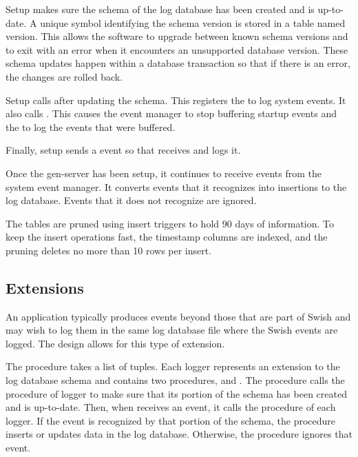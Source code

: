 Setup makes sure the schema of the log database has been created and
is up-to-date. A unique symbol identifying the schema version is
stored in a table named version. This allows the software to upgrade
between known schema versions and to exit with an error when it
encounters an unsupported database version. These schema updates
happen within a database transaction so that if there is an error, the
changes are rolled back.

Setup calls  after updating the
schema. This registers the  to log system events. It
also calls . This causes the event
manager to stop buffering startup events and the  to
log the events that were buffered.

Finally, setup sends a  event so that
 receives and logs it.

Once the  gen-server has been setup, it continues to
receive events from the system event manager. It converts events that
it recognizes into insertions to the log database. Events that it does
not recognize are ignored.

The tables are pruned using insert triggers to hold 90 days of
information. To keep the insert operations fast, the timestamp columns
are indexed, and the pruning deletes no more than 10 rows per insert.

\subsection {Extensions}

An application typically produces events beyond those that are part of
Swish and may wish to log them in the same log database file where the
Swish events are logged. The  design allows for this
type of extension.

The  procedure takes a list of
 tuples. Each logger represents an extension
to the log database schema and contains two procedures, 
and . The  procedure calls the
 procedure of logger to make sure that its portion of
the schema has been created and is up-to-date. Then, when
 receives an event, it calls the  procedure
of each logger. If the event is recognized by that portion of the
schema, the  procedure inserts or updates data in the log
database. Otherwise, the procedure ignores that event.

